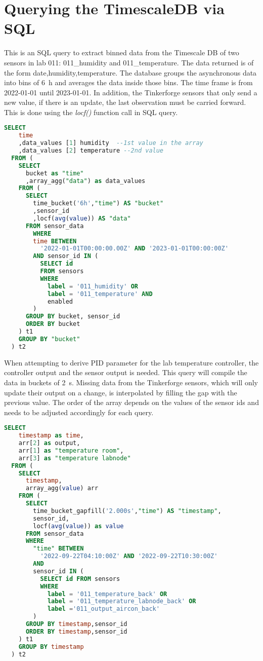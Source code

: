 \documentclass[12pt]{book}
\begin{document}
\section{Querying the TimescaleDB via SQL}%
\label{sec:appendix_query_kraken}
This is an SQL query to extract binned data from the Timescale DB of two sensors in lab 011: \textsf{011\_humidity} and \textsf{011\_temperature}. The data returned is of the form \textsf{date,humidity,temperature}. The database groups the asynchronous data into bins of \qty{6}{\hour} and averages the data inside those bins. The time frame is from 2022-01-01 until 2023-01-01. In addition, the Tinkerforge sensors that only send a new value, if there is an update, the last observation must be carried forward. This is done using the \textit{locf()} function call in SQL query.

\begin{lstlisting}[language=sql,title=SQL query]
  SELECT
    time
    ,data_values [1] humidity  --1st value in the array
    ,data_values [2] temperature --2nd value
  FROM (
    SELECT
      bucket as "time"
      ,array_agg("data") as data_values
    FROM (
      SELECT
        time_bucket('6h',"time") AS "bucket"
        ,sensor_id
        ,locf(avg(value)) AS "data"
      FROM sensor_data
        WHERE
        time BETWEEN
          '2022-01-01T00:00:00.00Z' AND '2023-01-01T00:00:00Z'
        AND sensor_id IN (
          SELECT id
          FROM sensors
          WHERE
            label = '011_humidity' OR
            label = '011_temperature' AND
            enabled
        )
      GROUP BY bucket, sensor_id
      ORDER BY bucket
    ) t1
    GROUP BY "bucket"
  ) t2
\end{lstlisting}

\clearpage
When attempting to derive PID parameter for the lab temperature controller, the controller output and the sensor output is needed. This query will compile the data in buckets of \qty{2}{\s}. Missing data from the Tinkerforge sensors, which will only update their output on a change, is interpolated by filling the gap with the previous value. The order of the array depends on the values of the sensor ids and needs to be adjusted accordingly for each query.

\begin{lstlisting}[language=sql,title=SQL query]
  SELECT
    timestamp as time,
    arr[2] as output,
    arr[1] as "temperature room",
    arr[3] as "temperature labnode"
  FROM (
    SELECT
      timestamp,
      array_agg(value) arr
    FROM (
      SELECT
        time_bucket_gapfill('2.000s',"time") AS "timestamp",
        sensor_id,
        locf(avg(value)) as value
      FROM sensor_data
      WHERE
        "time" BETWEEN
          '2022-09-22T04:10:00Z' AND '2022-09-22T10:30:00Z'
        AND
        sensor_id IN (
          SELECT id FROM sensors
          WHERE
            label = '011_temperature_back' OR
            label = '011_temperature_labnode_back' OR
            label ='011_output_aircon_back'
        )
      GROUP BY timestamp,sensor_id
      ORDER BY timestamp,sensor_id
    ) t1
    GROUP BY timestamp
  ) t2
\end{lstlisting}
\end{document}
